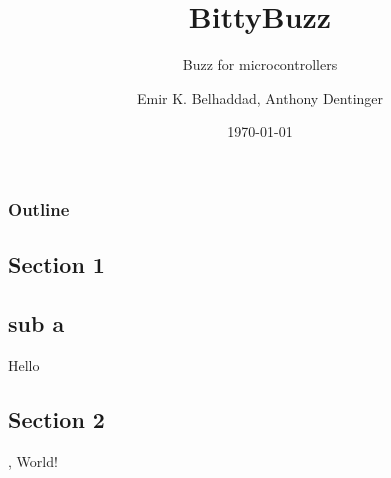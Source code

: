 \documentclass{beamer}
\title{BittyBuzz}
\subtitle{Buzz for microcontrollers}
\author{Emir K. Belhaddad, Anthony Dentinger}
\date{\today}
\begin{document}
	\begin{frame}
		\titlepage
	\end{frame}
	\begin{frame}
		\frametitle{Outline}
		\tableofcontents
	\end{frame}
	\begin{frame}
		\section{Section 1}
		\subsection{sub a}
		Hello
	\end{frame}
	\begin{frame}
		\section{Section 2}
		, World!
	\end{frame}
\end{document}
